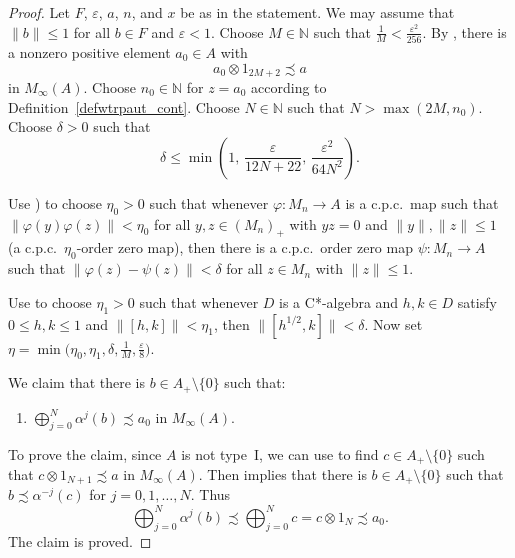 \documentclass[11pt]{amsart}
\theoremstyle{plain}
\theoremstyle{definition}
\theoremstyle{remark}
\numberwithin{equation}{section}
\newcounter{TmpEnumi}
\newcommand{\dt}{\delta}
\newcommand{\ep}{\varepsilon}
\newcommand{\et}{\eta}
\begin{document}
\begin{proof}
Let $F$, $\varepsilon$, $a$, $n$, and $x$ be as in the statement.
We may assume that $\| b \| \leq 1$ for all $b \in F$
and $\varepsilon < 1$.
Choose $M \in \mathbb{N}$ such that
$\tfrac{1}{M} < \tfrac{\varepsilon^{2}}{256}$.
By \cite[Lemma~2.1]{Ph14},
there is a nonzero positive element $a_{0} \in A$
with
%
\begin{equation}\label{Eq_8615_a0Sub}
a_{0} \otimes 1_{2 M + 2} \precsim a
\end{equation}
%
in $M_{\infty} (A)$.
Choose $n_{0} \in \mathbb{N}$ for $z = a_{0}$
according to Definition~\ref{defwtrpaut_cont}.
Choose $N \in \mathbb{N}$
such that $N > \max (2 M, n_{0} )$.
Choose $\delta > 0$ such that
\[
\dt \leq \min \left( 1, \, \frac{\ep}{12 N + 22},
          \, \frac{\ep^2}{64 N^2} \right).
\]

Use \cite[Proposition 2.5]{KW04})
to choose $\eta_0 > 0$ such that
whenever $\varphi \colon M_{n} \to A$
is a c.p.c.\  map
such that $\|\varphi (y) \varphi (z) \| < \eta_0$ for
all $y, z \in (M_{n})_{+}$ with $y z = 0$ and $\|y\|, \|z\| \leq 1$
(a c.p.c.\  $\et_0$-order zero map),
then there is a c.p.c.~order zero map
$\psi \colon M_{n} \to A$
such that $\|\varphi (z) - \psi (z) \| < \delta$
for all $z \in M_{n}$ with $\| z \| \leq 1$.

Use \cite[Lemma~2.5]{AP16} to choose
$\eta_1 > 0$ such that whenever $D$ is a C*-algebra
and $h, k \in D$ satisfy $0 \leq h, k \leq 1$
and $\| [h, k]\| < \eta_1$, then $\| [h^{1/2}, k] \| < \delta$.
Now set
$\eta
 = \min \big( \eta_0, \eta_1, \delta, \tfrac{1}{M},
      \tfrac{\varepsilon}{8} \big)$.

We claim that there is $b \in A_{+} \setminus \{ 0 \}$ such that:
%
\begin{enumerate}
\setcounter{enumi}{\value{TmpEnumi}}
\item\label{lem7_9item4}
$\bigoplus_{j = 0}^{N} \alpha^{j} (b) \precsim a_{0}$
in $M_{\infty} (A)$.
\setcounter{TmpEnumi}{\value{enumi}}
\end{enumerate}
%
To prove the claim,
since $A$ is not type~I,
we can use \cite[Lemma~2.1]{Ph14} to find
$c \in A_{+} \setminus \{ 0 \}$ such that
$c \otimes 1_{N + 1} \precsim a$ in $M_{\infty} (A)$.
Then \cite[Lemma~2.4]{Ph14} implies that there is
$b \in A_{+} \setminus \{ 0 \}$
such that $b \precsim \alpha^{- j} (c)$
for $j = 0, 1, \ldots, N$.
Thus
\[
\bigoplus_{j = 0}^{N} \alpha^{j} (b)
 \precsim \bigoplus_{j = 0}^{N} c
 = c \otimes 1_{N}
 \precsim a_{0}.
\]
The claim is proved.


\end{proof}
\end{document}
